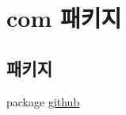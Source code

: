 \hypertarget{namespacecom}{}\section{com 패키지}
\label{namespacecom}
\subsection*{패키지}
\begin{DoxyCompactItemize}
\item 
package \mbox{\hyperlink{namespacecom_1_1github}{github}}
\end{DoxyCompactItemize}
